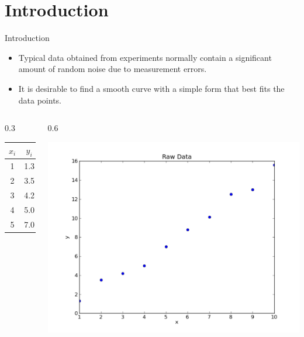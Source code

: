 \documentclass{beamer}
\begin{document}
\section[Introduction]{Introduction}
\begin{frame}{Introduction}
\begin{itemize}
\item Typical data obtained from experiments normally contain a significant amount of random noise due to measurement errors. 
\item It is desirable to find a smooth curve with a simple form that \alert{best} fits the data points. 
\end{itemize}
\begin{columns}
\begin{column}[b]{0.3\textwidth}
\begin{center}
\begin{tabular}{cc|cc}
\hline
$x_i$ & $y_i$ & $x_i$ & $y_i$
\\\hline
1 & 1.3 & 6 & 8.8\\
2 & 3.5 & 7 & 10.1 \\
3 & 4.2 & 8 & 12.5\\
4 & 5.0 & 9 & 13.0 \\
5 & 7.0 & 10 & 15.6\\
\hline
\end{tabular}
\end{center}
\end{column}
\begin{column}{0.6\textwidth}
\centerline{\includegraphics[width=\textwidth]{Lec11_fig1.pdf}}
\end{column}
\end{columns}
\end{frame}
\end{document}

